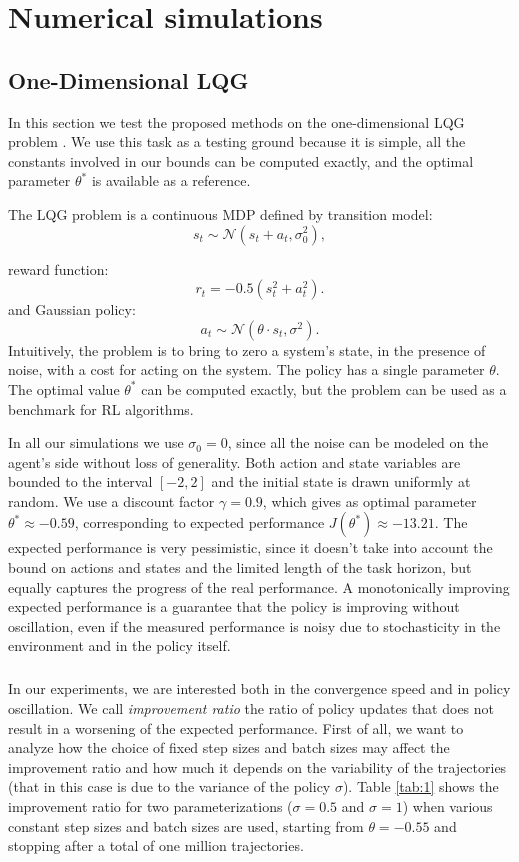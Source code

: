\chapter{Numerical simulations}\label{sec:simul}

\section{One-Dimensional LQG}\label{sec:lqg1d}
In this section we test the proposed methods on the one-dimensional \ac{LQG} problem \cite{4867}. We use this task as a testing ground because it is simple, all the constants involved in our bounds can be computed exactly, and the optimal parameter $\theta^*$ is available as a reference.

The LQG problem is a continuous \ac{MDP} defined by transition model:
\[
	s_t \sim \mathcal{N}(s_t+a_t,\sigma_0^2),
\] 

reward function:
\[
	r_t=-0.5(s_t^2+a_t^2).
\]
and Gaussian policy:
\[
	a_t \sim \mathcal{N}(\theta\cdot s_t,\sigma^2).
\]
Intuitively, the problem is to bring to zero a system's state, in the presence of noise, with a cost for acting on the system.
The policy has a single parameter $\theta$. The optimal value $\theta^*$ can be computed exactly, but the problem can be used as a benchmark for \ac{RL} algorithms.

In all our simulations we use $\sigma_0 = 0$, since all the noise can be modeled on the agent's side without loss of generality. Both action and state variables are bounded to the interval $[-2,2]$ and the initial state is drawn uniformly at random.  
We use a discount factor $\gamma=0.9$, which gives as optimal parameter $\theta^* \approx -0.59$, corresponding to expected performance $J(\theta^*) \approx -13.21$. The expected performance is very pessimistic, since it doesn't take into account the bound on actions and states and the limited length of the task horizon, but equally captures the progress of the real performance. A monotonically improving expected performance is a guarantee that the policy is improving without oscillation, even if the measured performance is noisy due to stochasticity in the environment and in the policy itself.
\paragraph{}
In our experiments, we are interested both in the convergence speed and in policy oscillation. We call \textit{improvement ratio} the ratio of policy updates that does not result in a worsening of the expected performance. First of all, we want to analyze how the choice of fixed step sizes and batch sizes may affect the improvement ratio and how much it depends on the variability of the trajectories (that in this case is due to the variance of the policy $\sigma$).
Table \ref{tab:1} shows the improvement ratio for two parameterizations ($\sigma=0.5$ and $\sigma=1$) when various constant step sizes and batch sizes are used, starting from $\theta=-0.55$ and stopping after a total of one million trajectories. 

